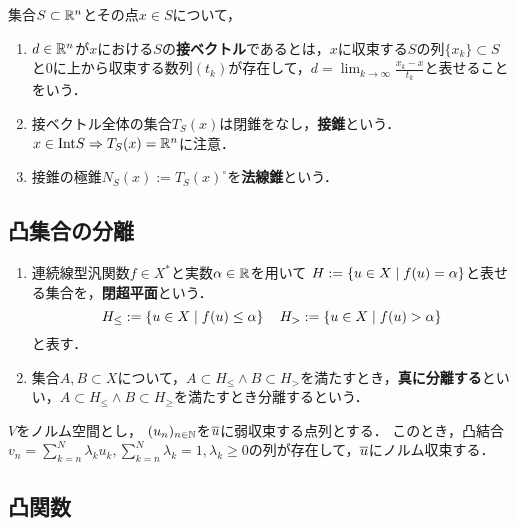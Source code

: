 \documentclass[uplatex,dvipdfmx]{jsreport}
\begin{document}
\begin{definition}
    集合$S\subset\mathbb{R}^n$とその点$x\in S$について，
    \begin{enumerate}
        \item $d\in\mathbb{R}^n$が$x$における$S$の\textbf{接ベクトル}であるとは，$x$に収束する$S$の列$\{x_k\}\subset S$と$0$に上から収束する数列$(t_k)$が存在して，$d=\lim_{k\to\infty}\frac{x_k-x}{t_k}$と表せることをいう．
        \item 接ベクトル全体の集合$T_S(x)$は閉錐をなし，\textbf{接錐}という．$x\in\mathrm{Int} S\Rightarrow T_S(x)=\mathbb{R}^n$に注意．
        \item 接錐の極錐$N_S(x):=T_S(x)^\circ$を\textbf{法線錐}という．
    \end{enumerate}
\end{definition}

\subsection{凸集合の分離}

\begin{definition}\mbox{}
    \begin{enumerate}
        \item 連続線型汎関数$f\in X^*$と実数$\alpha\in\mathbb{R}$を用いて
        $H:=\left\{u\in X\mid f(u)=\alpha\right\}$と表せる集合を，\textbf{閉超平面}という．
        \[H_\le:=\left\{u\in X\mid f(u)\le\alpha\right\}\quad H_>:=\left\{u\in X\mid f(u)>\alpha\right\}\]
        と表す．
        \item 集合$A,B\subset X$について，$A\subset H_\le\land B\subset H_>$を満たすとき，\textbf{真に分離する}といい，$A\subset H_\le\land B\subset H_\ge$を満たすとき分離するという．
    \end{enumerate}
\end{definition}

\begin{lemma}
    $V$をノルム空間とし，
    $(u_n)_{n\in\mathbb{N}}$を$\overline{u}$に弱収束する点列とする．
    このとき，凸結合$v_n=\sum^N_{k=n}\lambda_ku_k,\sum^N_{k=n}\lambda_k=1,\lambda_k\ge0$の列が存在して，$\overline{u}$にノルム収束する．
\end{lemma}

\subsection{凸関数}
\end{document}

